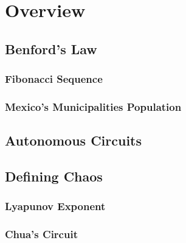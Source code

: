 

\section{Overview}


\subsection{Benford's Law}


\subsubsection{Fibonacci Sequence}


\subsubsection{Mexico's Municipalities Population}


\newpage
\subsection{Autonomous Circuits}


\subsection{Defining Chaos}


\subsubsection{Lyapunov Exponent}


\subsubsection{Chua's Circuit}


